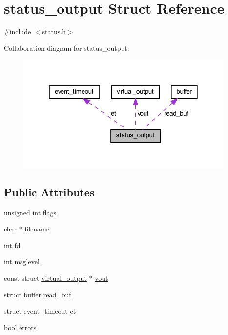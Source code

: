 \hypertarget{structstatus__output}{}\section{status\+\_\+output Struct Reference}
\label{structstatus__output}


{\ttfamily \#include $<$status.\+h$>$}



Collaboration diagram for status\+\_\+output\+:
\nopagebreak
\begin{figure}[H]
\begin{center}
\leavevmode
\includegraphics[width=307pt]{structstatus__output__coll__graph}
\end{center}
\end{figure}
\subsection*{Public Attributes}
\begin{DoxyCompactItemize}
\item 
unsigned int \hyperlink{structstatus__output_adf57b56523db94d46ea230efd261caed}{flags}
\item 
char $\ast$ \hyperlink{structstatus__output_ae6af8dceb46935b1bf0e8a5a50c1e971}{filename}
\item 
int \hyperlink{structstatus__output_a28855b59735ebae926cb82ef0e38c141}{fd}
\item 
int \hyperlink{structstatus__output_ad334b9226ff6fc50ac17df21dd35f527}{msglevel}
\item 
const struct \hyperlink{structvirtual__output}{virtual\+\_\+output} $\ast$ \hyperlink{structstatus__output_a5fe1214183abc62677c6a661d542605d}{vout}
\item 
struct \hyperlink{structbuffer}{buffer} \hyperlink{structstatus__output_a052edef1b995f0e73bc5b1156d35d457}{read\+\_\+buf}
\item 
struct \hyperlink{structevent__timeout}{event\+\_\+timeout} \hyperlink{structstatus__output_ad1803d8381fa3f452152251a5f8749e0}{et}
\item 
\hyperlink{automatic_8c_abb452686968e48b67397da5f97445f5b}{bool} \hyperlink{structstatus__output_aa1e0842854a283c001e67186696bf40c}{errors}
\end{DoxyCompactItemize}


